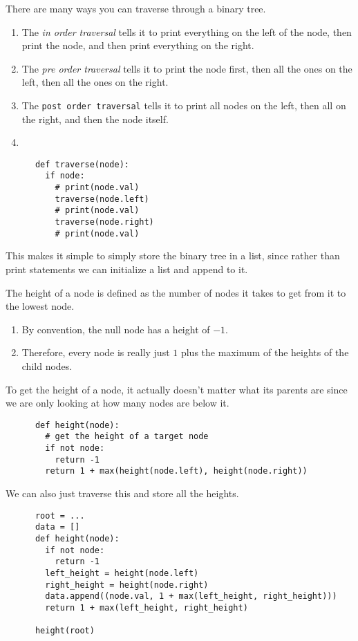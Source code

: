 \documentclass{article}
\begin{document}
  \begin{theorem}
    There are many ways you can traverse through a binary tree. 
    \begin{enumerate}
      \item The \textit{in order traversal} tells it to print everything on the left of the node, then print the node, and then print everything on the right.  
      \item The \textit{pre order traversal} tells it to print the node first, then all the ones on the left, then all the ones on the right. 
      \item The \texttt{post order traversal} tells it to print all nodes on the left, then all on the right, and then the node itself. 
      \item 
    \end{enumerate}
    \begin{lstlisting}
      def traverse(node): 
        if node: 
          # print(node.val) 
          traverse(node.left)
          # print(node.val) 
          traverse(node.right)
          # print(node.val) 
    \end{lstlisting}

    This makes it simple to simply store the binary tree in a list, since rather than print statements we can initialize a list and append to it. 
  \end{theorem}

  \begin{theorem}
    The height of a node is defined as the number of nodes it takes to get from it to the lowest node. 
    \begin{enumerate}
      \item By convention, the null node has a height of $-1$. 
      \item Therefore, every node is really just $1$ plus the maximum of the heights of the child nodes. 
    \end{enumerate}
    To get the height of a node, it actually doesn't matter what its parents are since we are only looking at how many nodes are below it. 
    \begin{lstlisting}
      def height(node): 
        # get the height of a target node
        if not node: 
          return -1 
        return 1 + max(height(node.left), height(node.right))
    \end{lstlisting}
    We can also just traverse this and store all the heights. 
    \begin{lstlisting}
      root = ...
      data = []
      def height(node): 
        if not node: 
          return -1
        left_height = height(node.left) 
        right_height = height(node.right) 
        data.append((node.val, 1 + max(left_height, right_height)))
        return 1 + max(left_height, right_height)

      height(root) 
    \end{lstlisting}
  \end{theorem}
\end{document}
